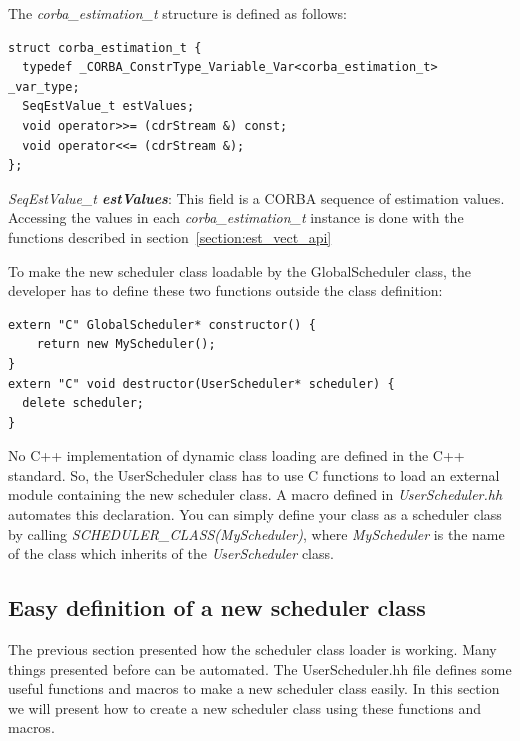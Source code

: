 \noindent The \textit{corba\_estimation\_t} structure is defined as follows:
\begin{verbatim}
struct corba_estimation_t {
  typedef _CORBA_ConstrType_Variable_Var<corba_estimation_t> _var_type;
  SeqEstValue_t estValues;
  void operator>>= (cdrStream &) const;
  void operator<<= (cdrStream &);
};
\end{verbatim}
\textit{SeqEstValue\_t \bf estValues}: This field is a CORBA sequence
of estimation values. Accessing the values in each
\textit{corba\_estimation\_t} instance is done with the functions
described in section~\ref{section:est_vect_api}

To make the new scheduler class loadable by the GlobalScheduler class, the
developer has to define these two functions outside the class definition:
\begin{verbatim}
extern "C" GlobalScheduler* constructor() {
    return new MyScheduler();
}
extern "C" void destructor(UserScheduler* scheduler) {
  delete scheduler;
}
\end{verbatim}
No C++ implementation of dynamic class loading are defined in the C++ standard.
So, the UserScheduler class has to use C functions to load an external module
containing the new scheduler class. A macro defined in \textit{UserScheduler.hh}
automates this declaration. You can simply define your class as a scheduler
class by calling \textit{SCHEDULER\_CLASS(MyScheduler)}, where
\textit{MyScheduler} is the name of the class which inherits of
the \textit{UserScheduler} class.

\subsection{Easy definition of a new scheduler class}
The previous section presented how the scheduler class loader is working. Many
things presented before can be automated. The UserScheduler.hh file defines
some useful functions and macros to make a new scheduler class easily. In this
section we will present how to create a new scheduler class using these
functions and macros.

